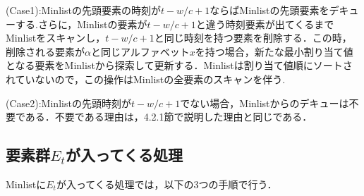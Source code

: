 \noindent (Case1):Minlistの先頭要素の時刻が$t-w/c+1$ならばMinlistの先頭要素をデキューする.さらに，Minlistの要素が$t-w/c+1$と違う時刻要素が出てくるまでMinlistをスキャンし，$t-w/c+1$と同じ時刻を持つ要素を削除する．この時，削除される要素が$\alpha$と同じアルファベット$x$を持つ場合，新たな最小割り当て値となる要素をMinlistから探索して更新する．Minlistは割り当て値順にソートされていないので，この操作はMinlistの全要素のスキャンを伴う.

\noindent (Case2):Minlistの先頭時刻が$t-w/c+1$でない場合，Minlistからのデキューは不要である．不要である理由は，4.2.1節で説明した理由と同じである．


\subsection{要素群$E_t$が入ってくる処理}
Minlistに$E_t$が入ってくる処理では，以下の3つの手順で行う．
